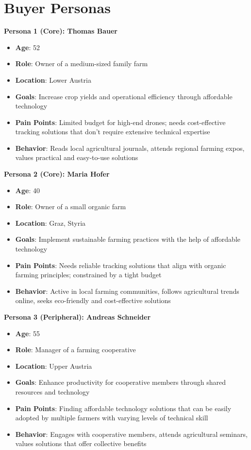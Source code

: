 \section{Buyer Personas}

\textbf{Persona 1 (Core): Thomas Bauer}

\begin{itemize}
	\item \textbf{Age}: 52 
	\item \textbf{Role}: Owner of a medium-sized family farm 
	\item \textbf{Location}: Lower Austria
	\item \textbf{Goals}: Increase crop yields and operational efficiency through affordable technology 
	\item \textbf{Pain Points}: Limited budget for high-end drones; needs cost-effective tracking solutions that don't require extensive technical expertise
	\item \textbf{Behavior}: Reads local agricultural journals, attends regional farming expos, values practical and easy-to-use solutions 
\end{itemize}

\textbf{Persona 2 (Core): Maria Hofer}

\begin{itemize} 
	\item \textbf{Age}: 40 
	\item \textbf{Role}: Owner of a small organic farm 
	\item \textbf{Location}: Graz, Styria 
	\item \textbf{Goals}: Implement sustainable farming practices with the help of affordable technology 
	\item \textbf{Pain Points}: Needs reliable tracking solutions that align with organic farming principles; constrained by a tight budget 
	\item \textbf{Behavior}: Active in local farming communities, follows agricultural trends online, seeks eco-friendly and cost-effective solutions 
\end{itemize}

\textbf{Persona 3 (Peripheral): Andreas Schneider}

\begin{itemize} 
	\item \textbf{Age}: 55 
	\item \textbf{Role}: Manager of a farming cooperative 
	\item \textbf{Location}: Upper Austria 
	\item \textbf{Goals}: Enhance productivity for cooperative members through shared resources and technology 
	\item \textbf{Pain Points}: Finding affordable technology solutions that can be easily adopted by multiple farmers with varying levels of technical skill 
	\item \textbf{Behavior}: Engages with cooperative members, attends agricultural seminars, values solutions that offer collective benefits 
\end{itemize}

